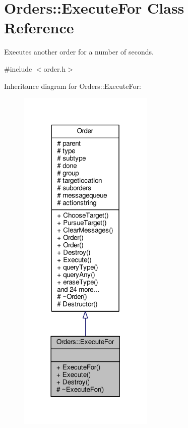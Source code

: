 \hypertarget{classOrders_1_1ExecuteFor}{}\section{Orders\+:\+:Execute\+For Class Reference}
\label{classOrders_1_1ExecuteFor}


Executes another order for a number of seconds.  




{\ttfamily \#include $<$order.\+h$>$}



Inheritance diagram for Orders\+:\+:Execute\+For\+:
\nopagebreak
\begin{figure}[H]
\begin{center}
\leavevmode
\includegraphics[width=182pt]{de/db0/classOrders_1_1ExecuteFor__inherit__graph}
\end{center}
\end{figure}


